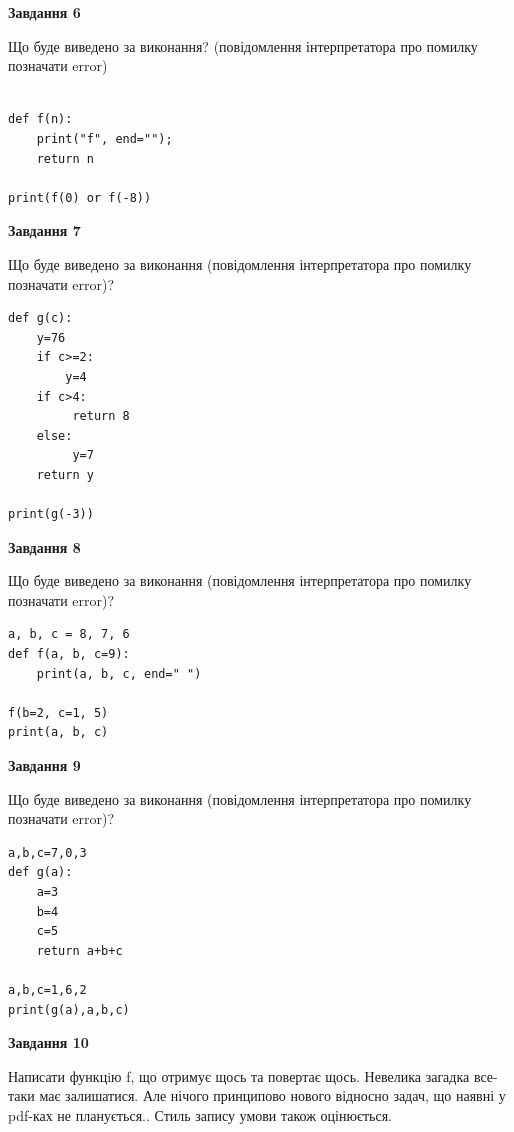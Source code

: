 \documentclass[12pt, ukrainian]{article}
\begin{document}
{\begin {large}
{\begin {center}\textbf{Завдання 6}\end {center}}

Що буде виведено за виконання? (повідомлення інтерпретатора про помилку позначати error)\par
\begin{verbatim}

def f(n):
    print("f", end="");
    return n

print(f(0) or f(-8))
\end{verbatim}

{\begin {center}\textbf{Завдання 7}\end {center}}

Що буде виведено за виконання (повідомлення інтерпретатора про помилку позначати error)?\par
\begin{verbatim}
def g(c):
    y=76
    if c>=2: 
        y=4
    if c>4:
         return 8
    else:
         y=7
    return y

print(g(-3))
\end{verbatim}

{\begin {center}\textbf{Завдання 8}\end {center}}

Що буде виведено за виконання (повідомлення інтерпретатора про помилку позначати error)?\par
\begin{verbatim}
a, b, c = 8, 7, 6
def f(a, b, c=9):
    print(a, b, c, end=" ")

f(b=2, c=1, 5)
print(a, b, c)
\end{verbatim}

{\begin {center}\textbf{Завдання 9}\end {center}}

Що буде виведено за виконання (повідомлення інтерпретатора про помилку позначати error)?\par
\begin{verbatim}
a,b,c=7,0,3
def g(a):
    a=3
    b=4
    c=5
    return a+b+c

a,b,c=1,6,2
print(g(a),a,b,c)
\end{verbatim}

{\begin {center}\textbf{Завдання 10}\end {center}}


Написати функцiю f, що отримує щось та повертає щось. Невелика загадка все-таки має залишатися. Але нічого принципово нового відносно задач, що наявні у pdf-ках не планується.. Стиль запису умови також оцінюється.\par
\end {large}}
\newpage
\end{document}

